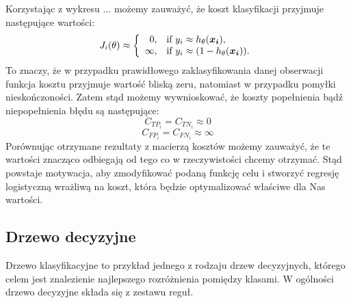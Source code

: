 \documentclass{book}
\begin{document}
    Korzystając z wykresu ... możemy zauważyć, że koszt klasyfikacji przyjmuje następujące wartości:
	$$
	J_i(\theta) \approx \left\{
	\begin{array}{rl}
	0, &\mbox{if $y_i \approx h_{\theta}(\boldsymbol{x_i})$}, \\
	\infty, &\mbox{if $y_i \approx (1 - h_{\theta}(\boldsymbol{x_i}))$}.
	\end{array}{}
	\right.
	$$
	To znaczy, że w przypadku prawidłowego zaklasyfikowania danej obserwacji funkcja kosztu przyjmuje wartość bliską zeru, natomiast w przypadku pomyłki nieskończoności. Zatem stąd możemy wywnioskować, że koszty popełnienia bądź niepopełnienia błędu są następujące:
	$$ C_{TP_i} = C_{TN_i} \approx 0 $$
	$$ C_{FP_i} = C_{FN_i} \approx \infty $$
	Porównując otrzymane rezultaty z macierzą kosztów możemy zauważyć, że te wartości znacząco odbiegają od tego co w rzeczywistości chcemy otrzymać. Stąd powstaje motywacja, aby zmodyfikować podaną funkcję celu i stworzyć regresję logistyczną wrażliwą na koszt, która będzie optymalizować właściwe dla Nas wartości.
\subsection{Drzewo decyzyjne}
\label{drzewo}

	Drzewo klasyfikacyjne to przykład jednego z rodzaju drzew decyzyjnych, którego celem jest znalezienie najlepszego rozróżnienia pomiędzy klasami. W ogólności drzewo decyzyjne składa się z zestawu reguł.
	
\end{document}
